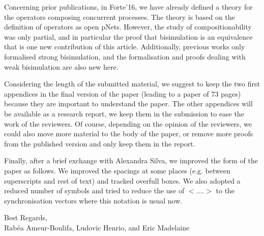 \documentclass[10pt]{article}
\begin{document}
Concerning prior publications, in Forte'16, we have already defined a theory for the operators composing concurrent processes. The theory is based on the definition of operators as open pNets. However, the study of compositionability was only partial, and in particular the proof that bisimulation is an equivalence that is one new contribution of this article. Additionally, previous works only formalised strong bisimulation, and the formalisation and proofs dealing with weak bisimulation are also new here.




\smallskip

Considering the length of the submitted material,
 we   suggest to
keep the two first appendices in the final version of the paper (leading to a
paper of 73 pages) because they are important to understand the paper.
The other appendices will be available as a research report, we keep
them in the submission to ease the work of the reviewers. 
Of course, depending on the opinion of the reviewers, we could also move more material to  the body of the paper, or remove more proofs from the published version and only keep them in the report.


\smallskip

Finally, after a brief exchange with Alexandra Silva, we improved the form of the paper as follows. We improved the spacings at some places (e.g. between superscripts and rest of text) and tracked overfull boxes. We also adopted a reduced number of symbols and tried to reduce the use of $<....>$ to the synchronisation vectors where this notation is usual now.

\begin{flushright}
  Best Regards,\\
  Rab\'ea Ameur-Boulifa, Ludovic Henrio, and Eric Madelaine
\end{flushright}
\end{document}
